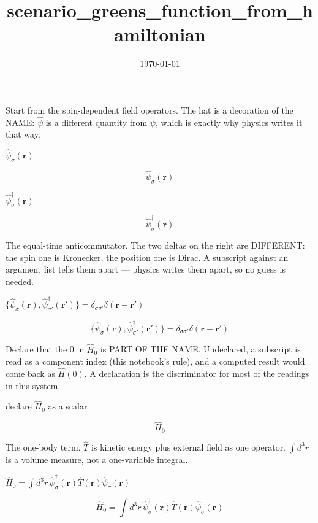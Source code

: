 \documentclass[dvipdfmx]{article}
\title{scenario\_greens\_function\_from\_hamiltonian}
\date{\today}
\begin{document}
\maketitle

Start from the spin-dependent field operators. The hat is a decoration of the NAME: $\hat\psi$ is a different quantity from $\psi$, which is exactly why physics writes it that way.

$\hat\psi_\sigma(\mathbf{r})$

\begin{equation}
  \hat\psi_\sigma(\mathbf{r})
  \label{eq:E1}
\end{equation}

$\hat\psi^\dagger_\sigma(\mathbf{r})$

\begin{equation}
  \hat\psi^\dagger_\sigma(\mathbf{r})
  \label{eq:E2}
\end{equation}

The equal-time anticommutator. The two deltas on the right are DIFFERENT: the spin one is Kronecker, the position one is Dirac. A subscript against an argument list tells them apart — physics writes them apart, so no guess is needed.

$\{\hat\psi_\sigma(\mathbf{r}), \hat\psi^\dagger_{\sigma'}(\mathbf{r}')\} = \delta_{\sigma\sigma'}\delta(\mathbf{r}-\mathbf{r}')$

\begin{equation}
  \{\hat\psi_\sigma(\mathbf{r}), \hat\psi^\dagger_{\sigma'}(\mathbf{r}')\} = \delta_{\sigma\sigma'}\delta(\mathbf{r}-\mathbf{r}')
  \label{eq:E3}
\end{equation}

Declare that the 0 in $\hat H_0$ is PART OF THE NAME. Undeclared, a subscript is read as a component index (this notebook's rule), and a computed result would come back as $\hat H(0)$. A declaration is the discriminator for most of the readings in this system.

declare $\hat H_0$ as a scalar

\[
  \hat{H}_{0}
\]

The one-body term. $\hat T$ is kinetic energy plus external field as one operator. $\int d^3r$ is a volume measure, not a one-variable integral.

$\hat H_0 = \int d^3r\, \hat\psi^\dagger_\sigma(\mathbf{r}) \hat T(\mathbf{r}) \hat\psi_\sigma(\mathbf{r})$

\begin{equation}
  \hat H_0 = \int d^3r\, \hat\psi^\dagger_\sigma(\mathbf{r}) \hat T(\mathbf{r}) \hat\psi_\sigma(\mathbf{r})
  \label{eq:E4}
\end{equation}
\end{document}
